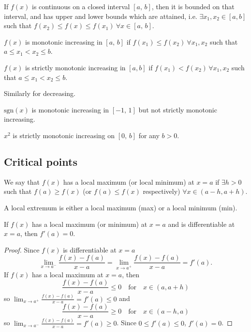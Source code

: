 \documentclass[10pt, a4paper]{article}
\begin{document}
\begin{theorem}\label{calc:thm:extvalthm}
    If $f(x)$ is continuous on a closed interval $[a,\,b]$,
    then it is bounded on that interval,
    and has upper and lower bounds which are attained,
    i.e. $\exists x_1, x_2 \in [a, b]$ such that $f(x_2) \leq f(x) \leq f(x_1)\ \forall x \in [a,\,b]$.
\end{theorem}

\begin{definition}
    $f(x)$ is monotonic increasing in $[a,\,b]$ if
    $f(x_1) \leq f(x_2)\ \forall x_1, x_2$ such that
    $a \leq x_1 < x_2 \leq b$.
\end{definition}

\begin{definition}
    $f(x)$ is strictly monotonic increasing in $[a, b]$
    if $f(x_1) < f(x_2)\, \forall x_1, x_2$ such that
    $a \leq x_1 < x_2 \leq b$.
\end{definition}

Similarly for decreasing.

\begin{example}
    $\mathrm{sgn}(x)$ is monotonic increasing in $[-1,\,1]$
    but not strictly monotonic increasing.
\end{example}

\begin{example}
    $x ^ 2$ is strictly monotonic increasing on $[0,\,b]$ for any $b > 0$.
\end{example}

\subsection{Critical points}

\begin{definition}
    We say that $f(x)$ has a local maximum (or local minimum) at $x = a$ if $\exists h > 0$ such that $f(a) \geq f(x)$ (or $f(a) \leq f(x)$ respectively) $\forall x \in (a - h, a + h)$.
\end{definition}

A local extremum is either a local maximum (max) or a local minimum (min).

If $f(x)$ has a local maximum (or minimum) at $x = a$ and is differentiable at $x = a$,
then $f'(a) = 0$.
\begin{proof}
    Since $f(x)$ is differentiable at $x = a$
    \[
    \lim_{x \rightarrow a ^ {-}}\frac{f(x) - f(a)}{x - a} = 
    \lim_{x \rightarrow a ^ {+}}\frac{f(x) - f(a)}{x - a} =
    f'(a).
    \]
    If $f(x)$ has a local maximum at $x = a$,
    then
    \[
    \frac{f(x) - f(a)}{x - a} \leq 0\quad\text{for}\quad x \in (a, a + h)
    \]
    so $\displaystyle \lim_{x \rightarrow a^{+}}\frac{f(x) - f(a)}{x - a} = f'(a) \leq 0$
    and
    \[
    \frac{f(x) - f(a)}{x - a} \geq 0\quad\text{for}\quad x \in (a - h, a)
    \]
    so $\displaystyle \lim_{x \rightarrow a^{-}}\frac{f(x) - f(a)}{x - a} = f'(a) \geq 0$.
    Since $0 \leq f'(a) \leq 0$,
    $f'(a) = 0$.
\end{proof}
\end{document}
